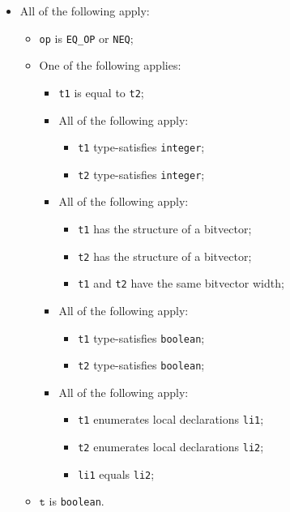 \documentclass{book}
\newcommand\vt[0]{\texttt{t}}
\begin{document}
\begin{itemize}
  \item All of the following apply:
    \begin{itemize}
    \item \texttt{op} is \texttt{EQ\_OP} or \texttt{NEQ};
    \item One of the following applies:
      \begin{itemize}
      \item \texttt{t1} is equal to \texttt{t2};
      \item All of the following apply:
        \begin{itemize}
        \item \texttt{t1} type-satisfies \texttt{integer};
        \item \texttt{t2} type-satisfies \texttt{integer};
        \end{itemize}
      \item All of the following apply:
        \begin{itemize}
        \item \texttt{t1} has the structure of a bitvector;
        \item \texttt{t2} has the structure of a bitvector;
        \item \texttt{t1} and \texttt{t2} have the same bitvector width;
        \end{itemize}
      \item All of the following apply:
        \begin{itemize}
        \item \texttt{t1} type-satisfies \texttt{boolean};
        \item \texttt{t2} type-satisfies \texttt{boolean};
        \end{itemize}
      \item All of the following apply:
        \begin{itemize}
        \item \texttt{t1} enumerates local declarations \texttt{li1};
        \item \texttt{t2} enumerates local declarations \texttt{li2};
        \item \texttt{li1} equals \texttt{li2};
        \end{itemize}
      \end{itemize}
    \item $\vt$ is \texttt{boolean}.
    \end{itemize}


\end{itemize}
\end{document}
